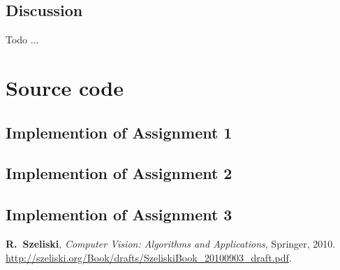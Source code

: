 \documentclass[a4paper,psfig,subfigure,epsfig,fleqn,ausarbeitung,amssmb,float,caption,fontenc]{article}
\begin{document}
\subsection{Discussion}

Todo ...

\appendix
\section{Source code}
\subsection{Implemention of Assignment 1}
\subsection{Implemention of Assignment 2}
\subsection{Implemention of Assignment 3}



\fontsize{9}{10pt}


\begin{thebibliography}{10}


{\bf R.~Szeliski},
\newblock \textit{Computer Vision: Algorithms and Applications},
\newblock Springer, 2010.
\newblock \url{http://szeliski.org/Book/drafts/SzeliskiBook_20100903_draft.pdf}.

\end{thebibliography}
\end{document}
